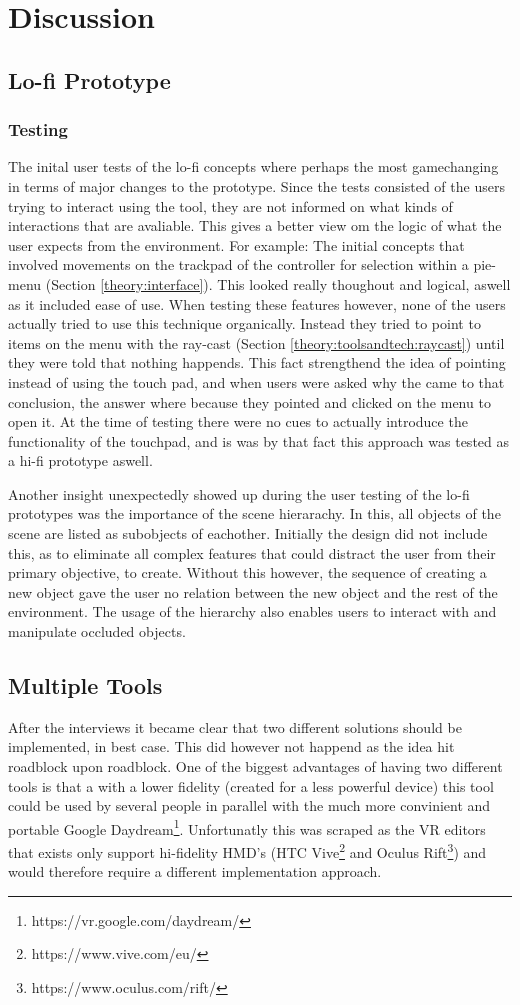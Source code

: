 
\chapter{Discussion}
\section{Lo-fi Prototype}
\subsection{Testing}
The inital user tests of the lo-fi concepts where perhaps the most gamechanging in terms of major changes to the prototype. Since the tests consisted of the users trying to interact using the tool, they are not informed on what kinds of interactions that are avaliable. This gives a better view om the logic of what the user expects from the environment. For example: The initial concepts that involved movements on the trackpad of the controller for selection within a pie-menu (Section \ref{theory:interface}). This looked really thoughout and logical, aswell as it included ease of use. When testing these features however, none of the users actually tried to use this technique organically. Instead they tried to point to items on the menu with the ray-cast (Section \ref{theory:toolsandtech:raycast}) until they were told that nothing happends. This fact strengthend the idea of pointing instead of using the touch pad, and when users were asked why the came to that conclusion, the answer where because they pointed and clicked on the menu to open it. At the time of testing there were no cues to actually introduce the functionality of the touchpad, and is was by that fact this approach was tested as a hi-fi prototype aswell.

Another insight unexpectedly showed up during the user testing of the lo-fi prototypes was the importance of the scene hierarachy. In this, all objects of the scene are listed as subobjects of eachother. Initially the design did not include this, as to eliminate all complex features that could distract the user from their primary objective, to create. Without this however, the sequence of creating a new object gave the user no relation between the new object and the rest of the environment. The usage of the hierarchy also enables users to interact with and manipulate occluded objects.

\section{Multiple Tools}
After the interviews it became clear that two different solutions should be implemented, in best case. This did however not happend as the idea hit roadblock upon roadblock. One of the biggest advantages of having two different tools is that a with a lower fidelity (created for a less powerful device) this tool could be used by several people in parallel with the much more convinient and portable Google Daydream\footnote{https://vr.google.com/daydream/}. Unfortunatly this was scraped as the VR editors that exists only support hi-fidelity HMD's (HTC Vive\footnote{https://www.vive.com/eu/} and Oculus Rift\footnote{https://www.oculus.com/rift/}) and would therefore require a different implementation approach.
